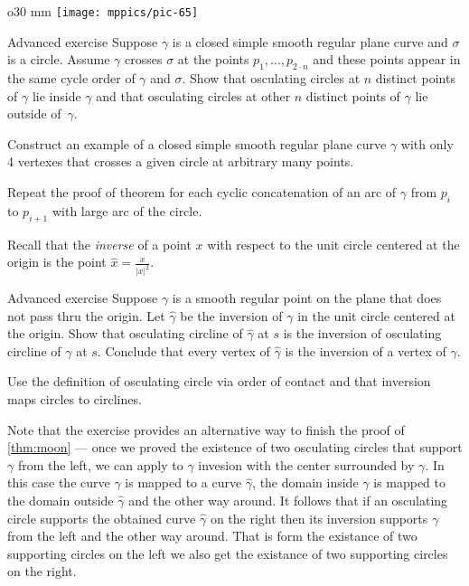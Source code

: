 \begin{wrapfigure}{o}{30 mm}
\vskip-4mm
\centering
\texttt{[image: mppics/pic-65]}
\vskip0mm
\end{wrapfigure}

\begin{thm}{Advanced exercise}
Suppose $\gamma$ is a closed simple smooth regular plane curve and $\sigma$ is a circle.
Assume $\gamma$ crosses $\sigma$ at the points $p_1,\dots,p_{2{\cdot} n}$ and these points appear in the same cycle order of $\gamma$ and $\sigma$.
Show that osculating circles at $n$ distinct points of $\gamma$ lie inside $\gamma$ and that osculating circles at other $n$ distinct points of $\gamma$ lie outside of~$\gamma$.

Construct an example of a closed simple smooth regular plane curve $\gamma$ with only 4 vertexes that crosses a given circle at arbitrary many points. 
\end{thm}

 Repeat the proof of theorem for each cyclic concatenation of an arc of $\gamma$ from $p_i$ to $p_{i+1}$ with large arc of the circle. 

Recall that the \emph{inverse} of a point $x$ with respect to the unit circle centered at the origin is the point $\hat x=\tfrac{x}{|x|^2}$.



\begin{thm}{Advanced exercise}
Suppose $\gamma$ is a smooth regular point on the plane that does not pass thru the origin.
Let $\hat \gamma$ be the inversion of $\gamma$ in the unit circle centered at the origin.
Show that osculating circline of $\hat\gamma$ at $s$ is the inversion of osculating circline of $\gamma$ at $s$.
Conclude that every vertex of $\hat\gamma$ is the inversion of a vertex of $\gamma$.
\end{thm}

 Use the definition of osculating circle via order of contact and that inversion maps circles to circlines. 


Note that the exercise provides an alternative way to finish the proof of \ref{thm:moon} --- once we proved the existence of two osculating circles that support $\gamma$ from the left,
we can apply to $\gamma$ invesion with the center surrounded by $\gamma$.
In this case the curve $\gamma$ is mapped to a curve $\hat \gamma$,
the domain inside $\gamma$ is mapped to the domain outside $\hat\gamma$ and the other way around.
It follows that if an osculating circle supports the obtained curve $\hat\gamma$ on the right 
then its inversion supports  $\gamma$ from the left and the other way around.
That is form the existance of two supporting circles on the left we also get the existance of two supporting circles on the right.


